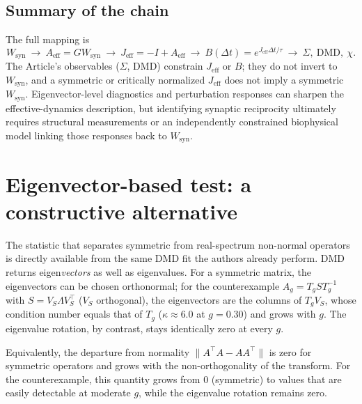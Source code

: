\documentclass[11pt]{article}
\begin{document}
\subsection{Summary of the chain}
The full mapping is
\begin{equation}
W_{\mathrm{syn}}\ \to\ A_{\mathrm{eff}}=GW_{\mathrm{syn}}\ \to\
J_{\mathrm{eff}}=-I+A_{\mathrm{eff}}\ \to\
B(\Delta t)=e^{J_{\mathrm{eff}}\Delta t/\tau}\ \to\ \Sigma,\ \mathrm{DMD},\ \chi.
\end{equation}
The Article's observables ($\Sigma$, DMD) constrain $J_{\mathrm{eff}}$ or $B$;
they do not invert to $W_{\mathrm{syn}}$, and a symmetric or critically
normalized $J_{\mathrm{eff}}$ does not imply a symmetric $W_{\mathrm{syn}}$.
Eigenvector-level diagnostics and perturbation responses can sharpen the
effective-dynamics description, but identifying synaptic reciprocity ultimately
requires structural measurements or an independently constrained biophysical
model linking those responses back to $W_{\mathrm{syn}}$.

\section{Eigenvector-based test: a constructive alternative}
\label{sec:eigenvector}

The statistic that separates symmetric from real-spectrum non-normal operators
is directly available from the same DMD fit the authors already perform. DMD
returns eigen\emph{vectors} as well as eigenvalues. For a symmetric matrix,
the eigenvectors can be chosen orthonormal; for the counterexample
$A_g=T_g S T_g^{-1}$ with $S=V_S\Lambda V_S^\top$ ($V_S$ orthogonal),
the eigenvectors are the columns of $T_g V_S$, whose condition number equals
that of $T_g$ ($\kappa\approx 6.0$ at $g=0.30$) and grows with $g$. The
eigenvalue rotation, by contrast, stays identically zero at every $g$.

Equivalently, the departure from normality
$\lVert A^\top A-AA^\top\rVert$ is zero for symmetric operators and grows
with the non-orthogonality of the transform. For the counterexample, this
quantity grows from $0$ (symmetric) to values that are easily detectable at
moderate $g$, while the eigenvalue rotation remains zero.
\end{document}
